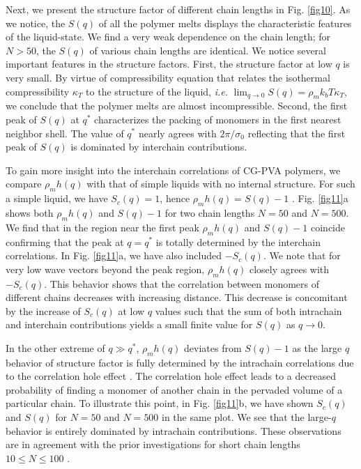 \documentclass[pre,showpacs,notitlepage,twocolumn]{revtex4-1}
\begin{document}
  
 
 
  Next, we present the structure factor of different chain lengths in Fig. \ref{fig10}. As we notice, the $S(q)$ of all the polymer melts displays the characteristic features  of the liquid-state. 
  We find a very weak dependence on the chain
  length; for $N> 50$, the $S(q)$ of various chain lengths  are identical. We notice several important features in the structure factors. 
    First, the structure factor at low $q$ is very small. By virtue of compressibility equation that relates the isothermal compressibility $\kappa_T$ to the structure of the liquid,
  {\it i.e.} $\lim_{q\rightarrow 0} S(q)=\rho_m k_b T \kappa_T $, we conclude that  the polymer melts are almost incompressible. 
 Second, the first peak of $S(q)$ at $q^*$ characterizes the packing of monomers in the first nearest neighbor shell. The value of $q^*$ nearly agrees  with $2 \pi/ \sigma_0$ reflecting that the first peak of
 $S(q)$ is dominated by interchain contributions.


To gain more insight into the interchain correlations of CG-PVA polymers, we compare $\rho_m h(q)$ with that of simple liquids with no internal structure. For such a simple liquid, we have $S_c(q)=1$, hence
$\rho_m h(q)=S(q)-1$ \cite{Hansen}. Fig. \ref{fig11}a shows both $\rho_m h(q)$ and $S(q)-1$ for two chain lengths $N=50$ and $N=500$. We find that in the region near the first peak $\rho_m h(q)$ and $S(q)-1$ coincide confirming that the
peak at $q=q^*$ is totally determined by the interchain correlations.  In Fig. \ref{fig11}a, we have also included $-S_c(q)$. We note that for very low wave vectors beyond the peak region, $\rho_m h(q)$ closely agrees with $-S_c(q)$.
This behavior shows that the correlation between monomers of different chains decreases with increasing distance.  This decrease is concomitant by the increase of $S_c(q)$ at low $q$ values such that the sum of both intrachain and interchain
contributions yields a small finite value for $S(q)$ as $q \rightarrow 0$. 

In the other extreme of $q \gg q^*$,    $\rho_m h(q)$  deviates from  $S(q)-1$   as the large $q$ behavior of structure factor is fully determined by
the intrachain correlations due to the  correlation hole effect  \cite{polymerDeGennes,Vettorel2007}. The correlation hole effect leads  to a decreased probability
of finding a monomer of another chain in the pervaded volume of a particular chain.
To illustrate this point, in  Fig. \ref{fig11}b, we have shown  $S_c(q)$ and $S(q)$ for  $N=50$ and $N=500$  in the same plot. We see that the large-$q$ behavior is entirely dominated by intrachain
contributions.  These observations are in agreement  with the prior investigations for short chain lengths
$ 10\le N \le 100$ \cite{Vettorel2007}. 
\end{document}
